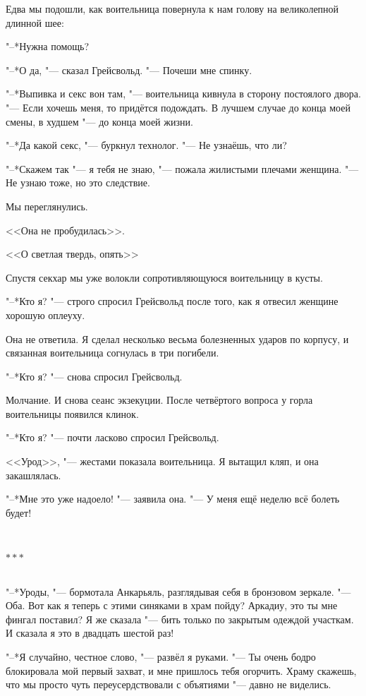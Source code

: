 \documentclass[a4paper,10pt,fleqn]{book}
\newcommand{\mulang}[3]{#2}%
\newcommand{\ldotst}{\so{...}\xspace}
\newcommand{\razd}{~\\{\centering\Large\bfseries$\ast \ast \ast$\par}~\\}
\begin{document}
Едва мы подошли, как воительница повернула к нам голову на великолепной длинной шее:

"--*Нужна помощь?

"--*О да, "--- сказал Грейсвольд.
"--- Почеши мне спинку.

"--*Выпивка и секс вон там, "--- воительница кивнула в сторону постоялого двора.
\mulang{}{"--- Если хочешь меня, то придётся подождать.}
{``If you want me, you have to wait.}
\mulang{}{В лучшем случае до конца моей смены, в худшем "--- до конца моей жизни.}
{At best, 'til the end of my shift; at worst, 'til the end of my life.''}

"--*Да какой секс, "--- буркнул технолог.
"--- Не узнаёшь, что ли?

"--*Скажем так "--- я тебя не знаю, "--- пожала жилистыми плечами женщина.
"--- Не узнаю тоже, но это следствие.

Мы переглянулись.

<<Она не пробудилась>>.

<<О светлая твердь, опять\ldotst>>

Спустя секхар мы уже волокли сопротивляющуюся воительницу в кусты.

"--*Кто я? "--- строго спросил Грейсвольд после того, как я отвесил женщине хорошую оплеуху.

Она не ответила.
Я сделал несколько весьма болезненных ударов по корпусу, и связанная воительница согнулась в три погибели.

"--*Кто я? "--- снова спросил Грейсвольд.

Молчание.
И снова сеанс экзекуции.
После четвёртого вопроса у горла воительницы появился клинок.

"--*Кто я? "--- почти ласково спросил Грейсвольд.

<<Урод>>, "--- жестами показала воительница.
Я вытащил кляп, и она закашлялась.

"--*Мне это уже надоело! "--- заявила она.
"--- У меня ещё неделю всё болеть будет!

\razd

"--*Уроды, "--- бормотала Анкарьяль, разглядывая себя в бронзовом зеркале.
"--- Оба.
Вот как я теперь с этими синяками в храм пойду?
Аркадиу, это ты мне фингал поставил?
Я же сказала "--- бить только по закрытым одеждой участкам.
И сказала я это в двадцать шестой раз!

"--*Я случайно, честное слово, "--- развёл я руками.
"--- Ты очень бодро блокировала мой первый захват, и мне пришлось тебя огорчить.
Храму скажешь, что мы просто чуть переусердствовали с объятиями "--- давно не виделись.
\end{document}
